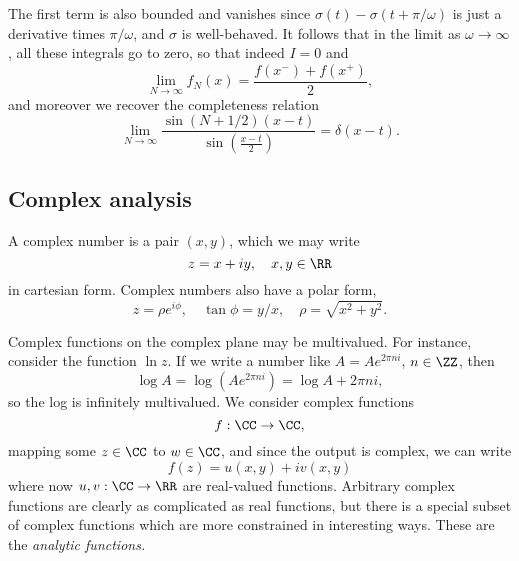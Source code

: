 The first term is also bounded and vanishes since $\sigma(t) -\sigma(t+\pi/\omega)$ is just a derivative times $\pi/\omega$, and $\sigma$ is well-behaved. It follows that in the limit as $\omega \to \infty$, all these integrals go to zero, so that indeed $I=0$ and
\begin{equation}
    \lim_{N\to \infty} f_N(x) = \frac{f(x^-) + f(x^+)}{2},
\end{equation}
and moreover we recover the completeness relation
\begin{equation}
    \lim_{N\to \infty} \frac{\sin(N+1/2)(x-t)}{\sin(\frac{x-t}{2})} = \delta(x-t).
\end{equation}

\subsection*{Complex analysis}
A complex number is a pair $(x,y)$, which we may write
\begin{equation}
    z = x+iy, \quad x,y\in \RR
\end{equation}
in cartesian form. Complex numbers also have a polar form,
\begin{equation}
    z = \rho e^{i\phi}, \quad \tan \phi =y/x, \quad \rho = \sqrt{x^2+y^2}.
\end{equation}

Complex functions on the complex plane may be multivalued. For instance, consider the function $\ln z$. If we write a number like $A = Ae^{2\pi n i}$, $n\in\ZZ$, then
\begin{equation}
    \log A = \log (Ae^{2\pi n i}) = \log A + 2\pi n i,
\end{equation}
so the log is infinitely multivalued. We consider complex functions
\begin{equation}
    f: \CC \to \CC,
\end{equation}
mapping some $z \in \CC$ to $w\in \CC$, and since the output is complex, we can write
\begin{equation}
    f(z) = u(x,y) + i v(x,y)
\end{equation}
where now $u,v: \CC \to \RR$ are real-valued functions. Arbitrary complex functions are clearly as complicated as real functions, but there is a special subset of complex functions which are more constrained in interesting ways. These are the \emph{analytic functions.}